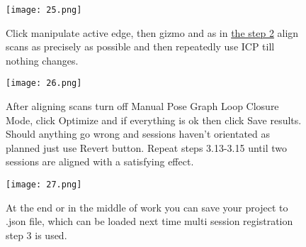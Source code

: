 \begin{figure}[H]
	\centering
	\texttt{[image: 25.png]}
	\caption{Click manipulate active edge, then gizmo and as in \hyperref[fig:15]{the step 2} align scans as precisely as possible and then repeatedly use ICP till nothing changes.}
	\label{fig:25}
\end{figure}

\begin{figure}[H]
	\centering
	\texttt{[image: 26.png]}
	\caption{After aligning scans turn off Manual Pose Graph Loop Closure Mode, click Optimize and if everything is ok then click Save results. Should anything go wrong and sessions haven't orientated as planned just use Revert button. Repeat steps 3.13-3.15 until two sessions are aligned with a satisfying effect.}
	\label{fig:26}
\end{figure}

\begin{figure}[H]
	\centering
	\texttt{[image: 27.png]}
	\caption{At the end or in the middle of work you can save your project to .json file, which can be loaded next time multi session registration step 3 is used.}
	\label{fig:27}
\end{figure}